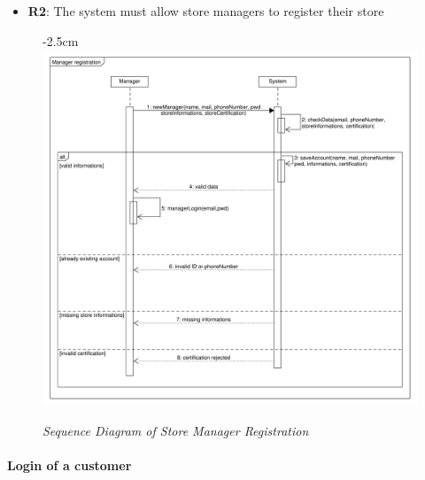 \documentclass{article}
\begin{document}
\begin{center}
\begin{adjustwidth}{-3cm}{}
\begin{tabular}[h!]{|m{7.5em}|m{36em}|}
					\end{tabular}
					\end{adjustwidth}
					
					\begin{itemize}
					\bigskip
					\bigskip
					\bigskip
					 {\bfseries Required functional requirements: }
					\item {\bfseries R2}: The system must allow store managers to register their store

					\end{itemize}
				
							\begin{figure}
								\begin{adjustwidth} {-2.5cm}{}
									\centering
									\includegraphics[scale=0.5]{SD/2_storeManagerRegistration.pdf}\\
									\caption{\emph{Sequence Diagram of Store Manager Registration}}
								\end{adjustwidth}
							\end{figure}

				\end{center}

			\newpage
			
			\paragraph{Login of a customer}
			
\end{document}
